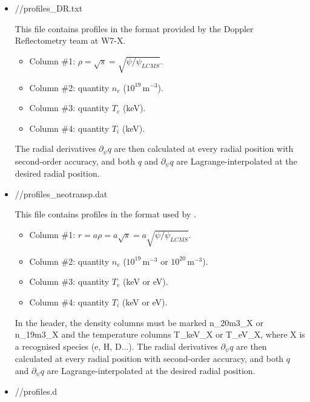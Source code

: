 \begin{itemize}
\item {\ttfamily //profiles\_DR.txt}

This file contains profiles in the format provided by the Doppler Reflectometry team at W7-X.
\begin{itemize}
\item Column \#1: $\rho=\sqrt{s}=\sqrt{\psi/\psi_{LCMS}}$.
\item Column \#2: quantity $n_e$ ($10^{19}\,$m$^{-3}$).
\item Column \#3: quantity $T_e$ (keV).
\item Column \#4: quantity $T_i$ (keV).
\end{itemize}
The radial derivatives $\partial_\psi q$ are then calculated at every  radial position with second-order accuracy, and both $q$ and $\partial_\psi q$ are Lagrange-interpolated at the desired radial position.

\item {\ttfamily //profiles\_neotransp.dat}

This file contains profiles in the format used by \NEOTRANSP.
\begin{itemize}
\item Column \#1: $r=a\rho=a\sqrt{s}=a\sqrt{\psi/\psi_{LCMS}}$.
\item Column \#2: quantity $n_e$ ($10^{19}\,$m$^{-3}$ or $10^{20}\,$m$^{-3}$).
\item Column \#3: quantity $T_e$ (keV or eV).
\item Column \#4: quantity $T_i$ (keV or eV).
\end{itemize}
In the header, the density columns must be marked {\ttfamily n\_20m3\_X} or {\ttfamily n\_19m3\_X} and the temperature columns {\ttfamily T\_keV\_X} or {\ttfamily T\_eV\_X}, where {\ttfamily X} is a recognised species ({\ttfamily e, H, D}...). The radial derivatives $\partial_\psi q$ are then calculated at every  radial position with second-order accuracy, and both $q$ and $\partial_\psi q$ are Lagrange-interpolated at the desired radial position.



\item {\ttfamily //profiles.d}


\end{itemize}
